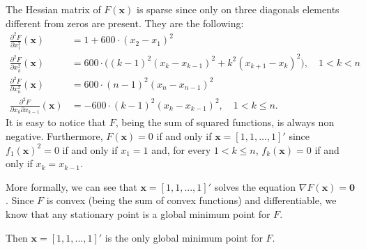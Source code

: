 The Hessian matrix of $F(\boldsymbol{x})$ is sparse since only on three diagonals elements different from zeros are present. They are the following:
\begin{align*}
    \frac{\partial^2 F}{\partial x_1^2} (\boldsymbol{x}) &= 1+600\cdot(x_2-x_1)^2 \\
    \frac{\partial^2 F}{\partial x_k^2} (\boldsymbol{x}) &= 600\cdot\Big((k-1)^2(x_k-x_{k-1})^2+k^2(x_{k+1}-x_k)^2 \Big), \quad 1 < k < n  & \\
    \frac{\partial^2 F}{\partial x_n^2} (\boldsymbol{x}) &=600\cdot(n-1)^2(x_n-x_{n-1})^2 \\
    \frac{\partial^2 F}{\partial x_k \partial x_{k-1}} (\boldsymbol{x}) &= -600\cdot (k-1)^2(x_k-x_{k-1})^2, \quad 1<k\leq n.
\end{align*}
It is easy to notice that $F$, being the sum of squared functions, is always non negative. Furthermore, $F(\boldsymbol{x})=0$ if and only if $\boldsymbol{x}=[1,1,...,1]'$ since $f_1(\boldsymbol{x})^2=0$ if and only if $x_1=1$ and, for every $1<k\leq n$, $f_k(\boldsymbol{x})=0$ if and only if $x_k=x_{k-1}$.

More formally, we can see that $\boldsymbol{x}=[1,1,...,1]'$ solves the equation $\nabla F(\boldsymbol{x})=\boldsymbol{0}$. Since $F$ is convex (being the sum of convex functions) and differentiable, we know that any stationary point is a global minimum point for $F$. 

Then $\boldsymbol{x}=[1,1,...,1]'$ is the only global minimum point for $F$.

